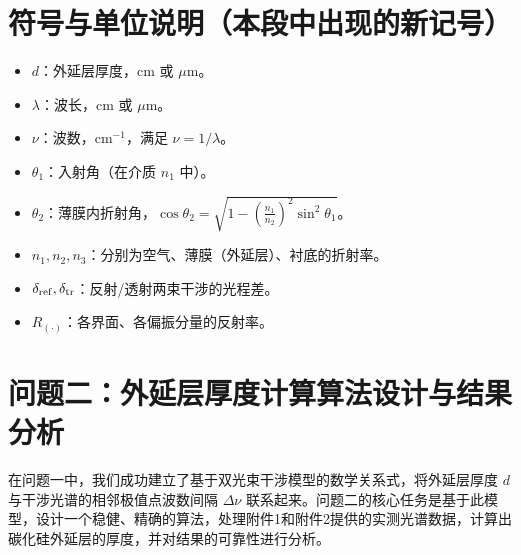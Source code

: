 \documentclass[withoutpreface,bwprint]{cumcmthesis} %
\begin{document}
\section{符号与单位说明（本段中出现的新记号）}
\begin{itemize}
    \item \(d\)：外延层厚度，cm 或 \(\mu\)m。
    \item \(\lambda\)：波长，cm 或 \(\mu\)m。
    \item \(\nu\)：波数，cm\(^{-1}\)，满足 \(\nu=1/\lambda\)。
    \item \(\theta_1\)：入射角（在介质 \(n_1\) 中）。
    \item \(\theta_2\)：薄膜内折射角，\(\cos\theta_2=\sqrt{1-(\tfrac{n_1}{n_2})^2\sin^2\theta_1}\)。
    \item \(n_1,n_2,n_3\)：分别为空气、薄膜（外延层）、衬底的折射率。
    \item \(\delta_{\rm ref},\delta_{\rm tr}\)：反射/透射两束干涉的光程差。
    \item \(R_{(\cdot)}\)：各界面、各偏振分量的反射率。
\end{itemize}


\section{问题二：外延层厚度计算算法设计与结果分析}

在问题一中，我们成功建立了基于双光束干涉模型的数学关系式，将外延层厚度 $d$ 与干涉光谱的相邻极值点波数间隔 $\Delta\nu$ 联系起来。问题二的核心任务是基于此模型，设计一个稳健、精确的算法，处理附件1和附件2提供的实测光谱数据，计算出碳化硅外延层的厚度，并对结果的可靠性进行分析。
\end{document}
